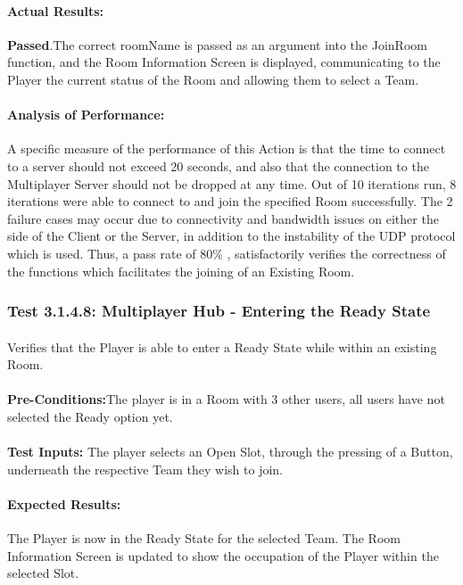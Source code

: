 \documentclass{article}
\begin{document}
    \paragraph{Actual Results:} \textbf{Passed}.The correct roomName is passed as an argument into the JoinRoom function, and the Room Information Screen is displayed, communicating to the Player the current status of the Room and allowing them to select a Team.
    \paragraph{Analysis of Performance:} A specific measure of the performance of this Action is that the time to connect to a server should not exceed 20 seconds, and also that the connection to the Multiplayer Server should not be dropped at any time. Out of 10 iterations run, 8 iterations were able to connect to and join the specified Room successfully. The 2 failure cases may occur due to connectivity and bandwidth issues on either the side of the Client or the Server, in addition to the instability of the UDP protocol which is used.  Thus, a pass rate of 80\% , satisfactorily verifies the correctness of the functions which facilitates the joining of an Existing Room.  
    
    \subsubsection{Test 3.1.4.8: Multiplayer Hub - Entering the Ready State}
    \paragraph{} Verifies that the Player is able to enter a Ready State while within an existing Room.
    \paragraph{}\textbf{Pre-Conditions:}The player is in a Room with 3 other users, all users have not selected the Ready option yet.
    \paragraph{}\textbf{Test Inputs:} The player selects an Open Slot, through the pressing of a Button, underneath the respective Team they wish to join.
    \paragraph{Expected Results:} The Player is now in the Ready State for the selected Team. The Room Information Screen is updated to show the occupation of the Player within the selected Slot.
\end{document}
